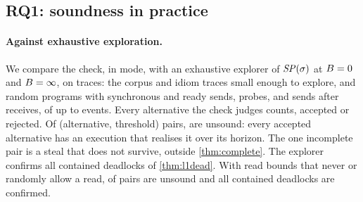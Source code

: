 \subsection{RQ1: soundness in practice}

\paragraph{Against exhaustive exploration.} We compare the check, in \Lone mode, with an
exhaustive explorer of $\mathit{SP}(\sigma)$ at $B=0$ and $B=\infty$, on \nEsixTraces traces: the
corpus and idiom traces small enough to explore, and random programs with synchronous and
ready sends, probes,  and sends after receives, of up to \nEsixMaxEvents
events. Every alternative the check judges counts, accepted or rejected. Of \nEsixPairs
(alternative, threshold) pairs, \nEsixUnsound are unsound: every accepted alternative has an
execution that realises it over its horizon. The one incomplete pair is
a steal that does not survive, outside \cref{thm:complete}. The explorer confirms
all \nEsixLdead contained deadlocks of \cref{thm:l1dead}. With read bounds that never or
randomly allow a read, \nReadsEsixUnsound of \nReadsEsixPairs pairs are unsound and all
\nReadsEsixLdead contained deadlocks are confirmed.


